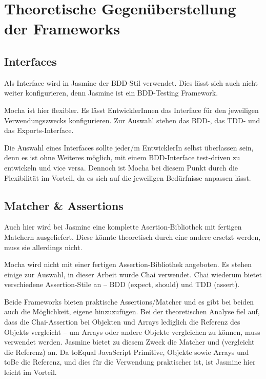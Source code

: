 \newpage
\section{Theoretische Gegenüberstellung der Frameworks}

\subsection{Interfaces}
Als Interface wird in Jasmine der BDD-Stil verwendet. Dies lässt sich auch nicht weiter konfigurieren, denn Jasmine ist ein BDD-Testing Framework.

Mocha ist hier flexibler. Es lässt EntwicklerInnen das Interface für den jeweiligen Verwendungszwecks konfigurieren. Zur Auswahl stehen das BDD-, das TDD- und das Exports-Interface.

Die Auswahl eines Interfaces sollte jeder/m EntwicklerIn selbst überlassen sein, denn es ist ohne Weiteres möglich, mit einem BDD-Interface test-driven zu entwickeln und vice versa. Dennoch ist Mocha bei diesem Punkt durch die Flexibilität im Vorteil, da es sich auf die jeweiligen Bedürfnisse anpassen lässt.

\subsection{Matcher \& Assertions}
Auch hier wird bei Jasmine eine komplette Asertion-Bibliothek mit fertigen Matchern ausgeliefert. Diese könnte theoretisch durch eine andere ersetzt werden, muss sie allerdings nicht.

Mocha wird nicht mit einer fertigen Assertion-Bibliothek angeboten. Es stehen einige zur Auswahl, in dieser Arbeit wurde Chai verwendet. Chai wiederum bietet verschiedene Assertion-Stile an -- BDD (expect, should) und TDD (assert).

Beide Frameworks bieten praktische Assertions/Matcher und es gibt bei beiden auch die Möglichkeit, eigene hinzuzufügen. Bei der theoretischen Analyse fiel auf, dass die Chai-Assertion  bei Objekten und Arrays lediglich die Referenz des Objekts vergleicht -- um Arrays oder andere Objekte vergleichen zu können, muss  verwendet werden. Jasmine bietet zu diesem Zweck die Matcher  und  (vergleicht die Referenz) an. Da toEqual JavaScript Primitive, Objekte sowie Arrays und toBe die Referenz, und dies für die Verwendung praktischer ist, ist Jasmine hier leicht im Vorteil.

